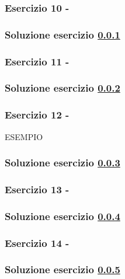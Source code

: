\documentclass[../main.tex]{subfiles}
\begin{document}
\vspace*{1.5cm}
\subsubsection{Esercizio 10 - }
\label{e2e10}

\subsubsection*{Soluzione esercizio \ref{e2e10}}

\vspace*{1.5cm}
\subsubsection{Esercizio 11 - }
\label{e2e11}

\subsubsection*{Soluzione esercizio \ref{e2e11}}

\vspace*{1.5cm}
\subsubsection{Esercizio 12 - }
\label{e2e12}

ESEMPIO

\subsubsection*{Soluzione esercizio \ref{e2e12}}

\vspace*{1.5cm}
\subsubsection{Esercizio 13 - }
\label{e2e13}

\subsubsection*{Soluzione esercizio \ref{e2e13}}

\vspace*{1.5cm}
\subsubsection{Esercizio 14 - }
\label{e2e14}

\subsubsection*{Soluzione esercizio \ref{e2e14}}
\end{document}
